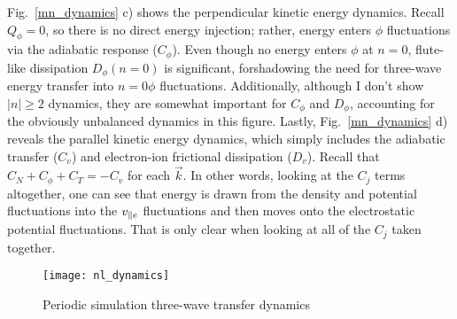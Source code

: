 Fig.~\ref{mn_dynamics} c) shows the perpendicular kinetic energy dynamics. Recall $Q_\phi = 0$, so there is no direct energy injection; rather, energy enters $\phi$ fluctuations via the adiabatic
response ($C_\phi$). Even though no energy enters $\phi$ at $n=0$, flute-like dissipation $D_\phi(n=0)$ is significant, forshadowing the need for three-wave energy transfer into $n=0 \phi$ 
fluctuations. Additionally, although I don't show $|n| \ge 2$ dynamics, they are somewhat important for $C_\phi$ and $D_\phi$, accounting for the obviously unbalanced dynamics in this figure.
Lastly, Fig.~\ref{mn_dynamics} d) reveals the parallel kinetic energy dynamics, which simply includes the adiabatic transfer ($C_v$) and electron-ion frictional dissipation ($D_v$). Recall that
$C_N + C_\phi + C_T = - C_v$ for each $\vec{k}$. In other words, looking at the $C_j$ terms altogether,
one can see that energy is drawn from the density and potential fluctuations into the $v_{\parallel e}$ fluctuations and then moves onto the electrostatic potential
fluctuations. That is only clear when looking at all of the $C_j$ taken together.

\begin{figure}[!ht]
\centerline{\texttt{[image: nl\_dynamics]}}
\caption{Periodic simulation three-wave transfer dynamics}
\label{nl_dynamics}
\end{figure}

